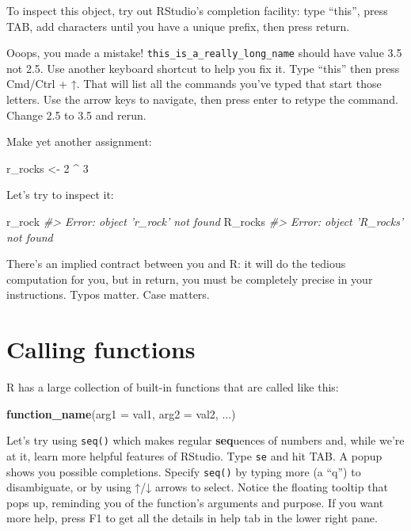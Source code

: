 \documentclass[]{book}
\newenvironment{Shaded}{\begin{snugshade}}{\end{snugshade}}
\newcommand{\KeywordTok}[1]{\textcolor[rgb]{0.13,0.29,0.53}{\textbf{{#1}}}}
\newcommand{\DataTypeTok}[1]{\textcolor[rgb]{0.13,0.29,0.53}{{#1}}}
\newcommand{\DecValTok}[1]{\textcolor[rgb]{0.00,0.00,0.81}{{#1}}}
\newcommand{\StringTok}[1]{\textcolor[rgb]{0.31,0.60,0.02}{{#1}}}
\newcommand{\CommentTok}[1]{\textcolor[rgb]{0.56,0.35,0.01}{\textit{{#1}}}}
\newcommand{\NormalTok}[1]{{#1}}
\begin{document}
To inspect this object, try out RStudio's completion facility: type
``this'', press TAB, add characters until you have a unique prefix, then
press return.

Ooops, you made a mistake! \texttt{this\_is\_a\_really\_long\_name}
should have value 3.5 not 2.5. Use another keyboard shortcut to help you
fix it. Type ``this'' then press Cmd/Ctrl + ↑. That will list all the
commands you've typed that start those letters. Use the arrow keys to
navigate, then press enter to retype the command. Change 2.5 to 3.5 and
rerun.

Make yet another assignment:

\begin{Shaded}
\begin{Highlighting}[]
\NormalTok{r_rocks <-}\StringTok{ }\DecValTok{2} \NormalTok{^}\StringTok{ }\DecValTok{3}
\end{Highlighting}
\end{Shaded}

Let's try to inspect it:

\begin{Shaded}
\begin{Highlighting}[]
\NormalTok{r_rock}
\CommentTok{#> Error: object 'r_rock' not found}
\NormalTok{R_rocks}
\CommentTok{#> Error: object 'R_rocks' not found}
\end{Highlighting}
\end{Shaded}

There's an implied contract between you and R: it will do the tedious
computation for you, but in return, you must be completely precise in
your instructions. Typos matter. Case matters.

\section{Calling functions}\label{calling-functions}

R has a large collection of built-in functions that are called like
this:

\begin{Shaded}
\begin{Highlighting}[]
\KeywordTok{function_name}\NormalTok{(}\DataTypeTok{arg1 =} \NormalTok{val1, }\DataTypeTok{arg2 =} \NormalTok{val2, ...)}
\end{Highlighting}
\end{Shaded}

Let's try using \texttt{seq()} which makes regular \textbf{seq}uences of
numbers and, while we're at it, learn more helpful features of RStudio.
Type \texttt{se} and hit TAB. A popup shows you possible completions.
Specify \texttt{seq()} by typing more (a ``q'') to disambiguate, or by
using ↑/↓ arrows to select. Notice the floating tooltip that pops up,
reminding you of the function's arguments and purpose. If you want more
help, press F1 to get all the details in help tab in the lower right
pane.
\end{document}
